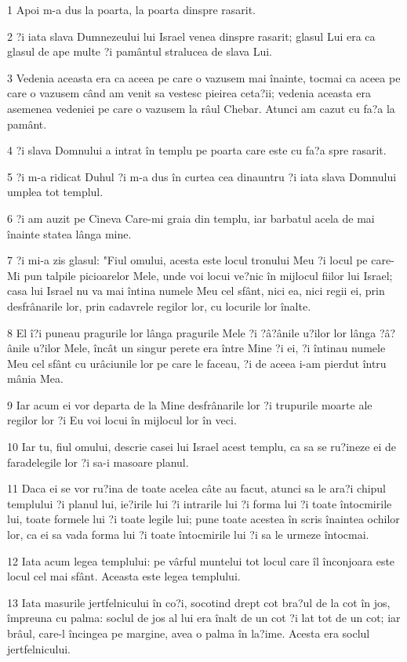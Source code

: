 \par 1 Apoi m-a dus la poarta, la poarta dinspre rasarit.
\par 2 ?i iata slava Dumnezeului lui Israel venea dinspre rasarit; glasul Lui era ca glasul de ape multe ?i pamântul stralucea de slava Lui.
\par 3 Vedenia aceasta era ca aceea pe care o vazusem mai înainte, tocmai ca aceea pe care o vazusem când am venit sa vestesc pieirea ceta?ii; vedenia aceasta era asemenea vedeniei pe care o vazusem la râul Chebar. Atunci am cazut cu fa?a la pamânt.
\par 4 ?i slava Domnului a intrat în templu pe poarta care este cu fa?a spre rasarit.
\par 5 ?i m-a ridicat Duhul ?i m-a dus în curtea cea dinauntru ?i iata slava Domnului umplea tot templul.
\par 6 ?i am auzit pe Cineva Care-mi graia din templu, iar barbatul acela de mai înainte statea lânga mine.
\par 7 ?i mi-a zis glasul: "Fiul omului, acesta este locul tronului Meu ?i locul pe care-Mi pun talpile picioarelor Mele, unde voi locui ve?nic în mijlocul fiilor lui Israel; casa lui Israel nu va mai întina numele Meu cel sfânt, nici ea, nici regii ei, prin desfrânarile lor, prin cadavrele regilor lor, cu locurile lor înalte.
\par 8 El î?i puneau pragurile lor lânga pragurile Mele ?i ?â?ânile u?ilor lor lânga ?â?ânile u?ilor Mele, încât un singur perete era între Mine ?i ei, ?i întinau numele Meu cel sfânt cu urâciunile lor pe care le faceau, ?i de aceea i-am pierdut întru mânia Mea.
\par 9 Iar acum ei vor departa de la Mine desfrânarile lor ?i trupurile moarte ale regilor lor ?i Eu voi locui în mijlocul lor în veci.
\par 10 Iar tu, fiul omului, descrie casei lui Israel acest templu, ca sa se ru?ineze ei de faradelegile lor ?i sa-i masoare planul.
\par 11 Daca ei se vor ru?ina de toate acelea câte au facut, atunci sa le ara?i chipul templului ?i planul lui, ie?irile lui ?i intrarile lui ?i forma lui ?i toate întocmirile lui, toate formele lui ?i toate legile lui; pune toate acestea în scris înaintea ochilor lor, ca ei sa vada forma lui ?i toate întocmirile lui ?i sa le urmeze întocmai.
\par 12 Iata acum legea templului: pe vârful muntelui tot locul care îl înconjoara este locul cel mai sfânt. Aceasta este legea templului.
\par 13 Iata masurile jertfelnicului în co?i, socotind drept cot bra?ul de la cot în jos, împreuna cu palma: soclul de jos al lui era înalt de un cot ?i lat tot de un cot; iar brâul, care-l încingea pe margine, avea o palma în la?ime. Acesta era soclul jertfelnicului.
